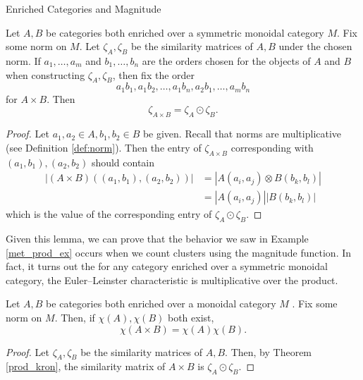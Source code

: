 \documentclass[12pt]{pom_thesis}
\newcommand{\kron}{\odot}
\begin{document}
\begin{chapter}{Enriched Categories and Magnitude}
\begin{lemma}\label{prod_kron}
Let $A, B$ be categories both enriched over a symmetric monoidal category $M$. Fix some norm on $M$. Let $\zeta_A, \zeta_B$ be the similarity matrices of $A,B$ under the chosen norm. If $a_1,\dots,a_m$ and $b_1,\dots,b_n$ are the orders chosen for the objects of $A$ and $B$ when constructing $\zeta_A, \zeta_B$, then fix the order \[a_1b_1, a_1b_2, \dots, a_1b_n, a_2b_1, \dots, a_mb_n\] for $A \times B$. Then
\[
\zeta_{A \times B} = \zeta_A \kron \zeta_B.
\]
\end{lemma}
\begin{proof}
Let $a_1, a_2 \in A, b_1, b_2 \in B$ be given. Recall that norms are multiplicative (see Definition \ref{def:norm}). Then the entry of $\zeta_{A \times B}$ corresponding with $(a_1, b_1), (a_2, b_2)$ should contain 
\begin{align*}
|(A \times B)((a_1, b_1), (a_2, b_2))|& = |A(a_i, a_j) \otimes B(b_k, b_l)|\\
&= |A(a_i, a_j)| |B(b_k, b_l)|
\end{align*}
which is the value of the corresponding entry of $\zeta_A \kron \zeta_B$.
\end{proof}

Given this lemma, we can prove that the behavior we saw in Example \ref{met_prod_ex} occurs when we count clusters using the magnitude function. In fact, it turns out the for any category enriched over a symmetric monoidal category, the Euler--Leinster characteristic is multiplicative over the product. 

\begin{thm}
Let $A, B$ be categories both enriched over a monoidal category $M$ . Fix some norm on $M$. Then, if $\chi(A), \chi(B)$ both exist,
\[
\chi(A \times B) = \chi(A)\chi(B).
\]
\end{thm}
\begin{proof}
Let $\zeta_A, \zeta_B$ be the similarity matrices of $A,B$. Then, by Theorem \ref{prod_kron}, the similarity matrix of $A \times B$ is $\zeta_A \kron \zeta_B$. 


\end{proof}
\end{chapter}
\end{document}
